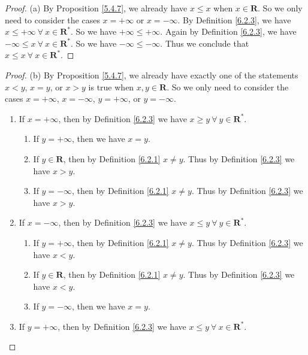\begin{proof}{(a)}
By Proposition \ref{5.4.7}, we already have \(x \leq x\) when \(x \in \mathbf{R}\).
So we only need to consider the cases \(x = +\infty\) or \(x = -\infty\).
By Definition \ref{6.2.3}, we have \(x \leq +\infty \ \forall\ x \in \mathbf{R}^*\).
So we have \(+\infty \leq +\infty\).
Again by Definition \ref{6.2.3}, we have \(-\infty \leq x \ \forall\ x \in \mathbf{R}^*\).
So we have \(-\infty \leq -\infty\).
Thus we conclude that \(x \leq x \ \forall\ x \in \mathbf{R}^*\).
\end{proof}

\begin{proof}{(b)}
By Proposition \ref{5.4.7}, we already have exactly one of the statements \(x < y\), \(x = y\), or \(x > y\) is true when \(x, y \in \mathbf{R}\).
So we only need to consider the cases \(x = +\infty\), \(x = -\infty\), \(y = +\infty\), or \(y = -\infty\).
\begin{enumerate}[label=(\Roman*)]
    \item If \(x = +\infty\), then by Definition \ref{6.2.3} we have \(x \geq y \ \forall\ y \in \mathbf{R}^*\).
    \begin{enumerate}[label=(\roman*)]
        \item If \(y = +\infty\), then we have \(x = y\).
        \item If \(y \in \mathbf{R}\), then by Definition \ref{6.2.1} \(x \neq y\).
        Thus by Definition \ref{6.2.3} we have \(x > y\).
        \item If \(y = -\infty\), then by Definition \ref{6.2.1} \(x \neq y\).
        Thus by Definition \ref{6.2.3} we have \(x > y\).
    \end{enumerate}
    \item If \(x = -\infty\), then by Definition \ref{6.2.3} we have \(x \leq y \ \forall\ y \in \mathbf{R}^*\).
    \begin{enumerate}[label=(\roman*)]
        \item If \(y = +\infty\), then by Definition \ref{6.2.1} \(x \neq y\).
        Thus by Definition \ref{6.2.3} we have \(x < y\).
        \item If \(y \in \mathbf{R}\), then by Definition \ref{6.2.1} \(x \neq y\).
        Thus by Definition \ref{6.2.3} we have \(x < y\).
        \item If \(y = -\infty\), then we have \(x = y\).
    \end{enumerate}
    \item If \(y = +\infty\), then by Definition \ref{6.2.3} we have \(x \leq y \ \forall\ x \in \mathbf{R}^*\).

\end{enumerate}
\end{proof}
